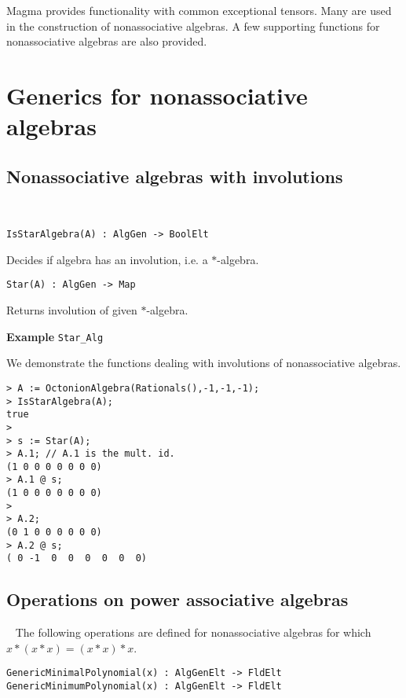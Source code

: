 
Magma provides functionality with common exceptional tensors.  Many are used in the
construction of nonassociative algebras.  A few supporting functions for nonassociative algebras
are also provided.

\section{Generics for nonassociative algebras}

\subsection{Nonassociative algebras with involutions}~

\color{blue}
{\small \begin{verbatim}
IsStarAlgebra(A) : AlgGen -> BoolElt
\end{verbatim}}
\color{black}

Decides if algebra has an involution, i.e. a $*$-algebra.

\color{blue}
{\small \begin{verbatim}
Star(A) : AlgGen -> Map
\end{verbatim}}
\color{black}

Returns involution of given $*$-algebra.

\begin{framed}{\bf Example} {\tt Star\_Alg}\\
{\small 
We demonstrate the functions dealing with involutions of nonassociative algebras.
\begin{lstlisting}[frame=single,basicstyle=\ttfamily\color{black!30!
teal},backgroundcolor=\color{white!70!gray}]
> A := OctonionAlgebra(Rationals(),-1,-1,-1);
> IsStarAlgebra(A);
true
> 
> s := Star(A);
> A.1; // A.1 is the mult. id.
(1 0 0 0 0 0 0 0)
> A.1 @ s; 
(1 0 0 0 0 0 0 0)
> 
> A.2;
(0 1 0 0 0 0 0 0)
> A.2 @ s;
( 0 -1  0  0  0  0  0  0)
\end{lstlisting}
}
\end{framed}

\subsection{Operations on power associative algebras}~
The following operations are defined for nonassociative algebras for which $x*(x*x)=(x*x)*x$.

\color{blue}
{\small \begin{verbatim}
GenericMinimalPolynomial(x) : AlgGenElt -> FldElt
GenericMinimumPolynomial(x) : AlgGenElt -> FldElt
\end{verbatim}}
\color{black}

